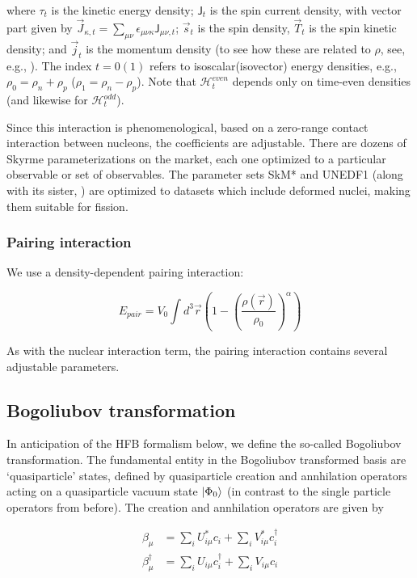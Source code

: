 \noindent where $\tau_t$ is the kinetic energy density; $\mathsf{J}_t$ is the spin current density, with vector part given by $\vec{J}_{\kappa,t} = \sum_{\mu\nu}\epsilon_{\mu\nu\kappa}\mathsf{J}_{\mu\nu,t}$; $\vec{s}_t$ is the spin density, $\vec{T}_t$ is the spin kinetic density; and $\vec{j}_t$ is the momentum density (to see how these are related to $\rho$, see, e.g., \cite{Bender2003}). The index $t=0(1)$ refers to isoscalar(isovector) energy densities, e.g., $\rho_0 = \rho_n + \rho_p$ ($\rho_1 = \rho_n - \rho_p$). Note that $\mathcal{H}^{even}_t$ depends only on time-even densities (and likewise for $\mathcal{H}^{odd}_t$).

Since this interaction is phenomenological, based on a zero-range contact interaction between nucleons, the coefficients are adjustable. There are dozens of Skyrme parameterizations on the market, each one optimized to a particular observable or set of observables. The parameter sets SkM* \cite{Bartel1982} and UNEDF1 \cite{Kortelainen2012} (along with its sister, {\hfb} \cite{Schunck2015}) are optimized to datasets which include deformed nuclei, making them suitable for fission.

\subsubsection{Pairing interaction}
We use a density-dependent pairing interaction:

\begin{equation}
E_{pair} = V_0 \int d^3\vec{r} \left( 1-\left(\frac{\rho(\vec{r})}{\rho_0}\right)^\alpha \right)
\end{equation}

\noindent As with the nuclear interaction term, the pairing interaction contains several adjustable parameters.

\subsection{Bogoliubov transformation}

In anticipation of the HFB formalism below, we define the so-called Bogoliubov transformation. The fundamental entity in the Bogoliubov transformed basis are `quasiparticle' states, defined by quasiparticle creation and annhilation operators acting on a quasiparticle vacuum state $\ket{\Phi_0}$ (in contrast to the single particle operators from before). The creation and annhilation operators are given by

\begin{align}
\beta_\mu &= \sum_i U^*_{i\mu}c_i + \sum_i V^*_{i\mu}c_i^\dagger \\
\beta_\mu^\dagger &= \sum_i U_{i\mu}c_i^\dagger + \sum_i V_{i\mu}c_i
\end{align}

